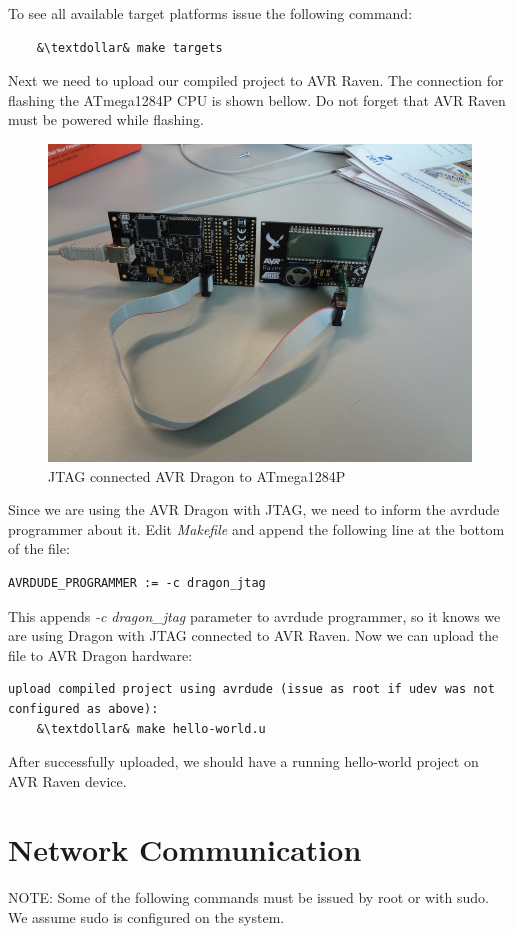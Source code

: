 \documentclass{article}
\begin{document}
To see all available target platforms issue the following command:
\begin{lstlisting}
	&\textdollar& make targets
\end{lstlisting}

Next we need to upload our compiled project to AVR Raven.
The connection for flashing the ATmega1284P CPU is shown bellow.
Do not forget that AVR Raven must be powered while flashing.
\begin{figure}[H]
  \centering
  \includegraphics[width=12cm,keepaspectratio]{smallfig/DSC02184-small.jpeg}
  \caption{JTAG connected AVR Dragon to ATmega1284P}
\end{figure}
Since we are using the AVR Dragon with JTAG, we need to inform the avrdude programmer about it.
Edit {\it{Makefile}} and append the following line at the bottom of the file:
\begin{lstlisting}
AVRDUDE_PROGRAMMER := -c dragon_jtag
\end{lstlisting}

This appends {\it{-c dragon\_jtag}} parameter to avrdude programmer, so it knows we are using Dragon with JTAG connected to AVR Raven.
Now we can upload the file to AVR Dragon hardware:
\begin{lstlisting}
upload compiled project using avrdude (issue as root if udev was not configured as above):
	&\textdollar& make hello-world.u
\end{lstlisting}
After successfully uploaded, we should have a running hello-world project on AVR Raven device.


\section{Network Communication}
NOTE: Some of the following commands must be issued by root or with sudo. We assume sudo is configured on the system.
\end{document}
